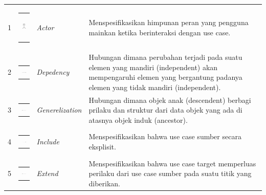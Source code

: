 \begin{enumerate}
{\begin{longtable}{p{0.5cm} p{2cm} p{2.5cm} p{7.4cm}}
		      1           & \begin{tabular}[c]{@{}l@{}} \includegraphics[height=1.22cm, width=0.91cm]{konten/gambar/uc1.jpg} \end{tabular} & \textit{Actor}          & Menspesifikasikan himpunan peran yang pengguna mainkan ketika berinteraksi dengan use case.                                                                              \\
		      2           & \begin{tabular}[c]{@{}l@{}} \includegraphics[height=0.21cm, width=0.91cm]{konten/gambar/uc2.png} \end{tabular} & \textit{Depedency}      & Hubungan dimana perubahan terjadi pada suatu elemen yang mandiri (independent) akan mempengaruhi elemen yang bergantung padanya elemen yang tidak mandiri (independent). \\
		      3           & \begin{tabular}[c]{@{}l@{}} \includegraphics[height=0.21cm, width=0.91cm]{konten/gambar/uc3.png} \end{tabular} & \textit{Generelization} & Hubungan dimana objek anak (descendent) berbagi prilaku dan struktur dari data objek yang ada di atasnya objek induk (ancestor).                                         \\
		      4           & \begin{tabular}[c]{@{}l@{}} \includegraphics[height=0.21cm, width=0.91cm]{konten/gambar/uc4.png} \end{tabular} & \textit{Include}        & Menspesifikasikan bahwa use case sumber secara eksplisit.                                                                                                                \\
		      5           & \begin{tabular}[c]{@{}l@{}} \includegraphics[height=0.21cm, width=0.91cm]{konten/gambar/uc5.png} \end{tabular} & \textit{Extend}         & Menspesifikasikan bahwa use case target memperluas perilaku dari use case sumber pada suatu titik yang diberikan.                                                        \\

\end{longtable}}
\end{enumerate}
